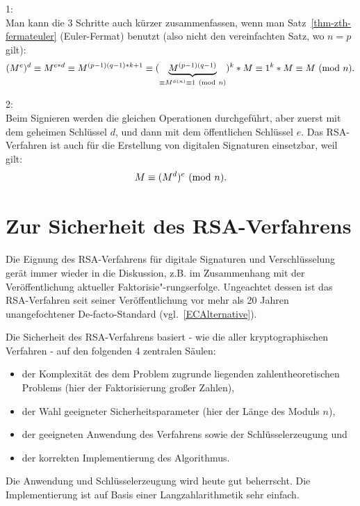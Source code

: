 \begin{refsegment}
\begin{remark}{ 1:}\\
Man kann die 3 Schritte auch kürzer zusammenfassen, wenn man
Satz~\ref{thm-zth-fermateuler} (Euler-Fermat) benutzt (also nicht den
vereinfachten Satz, wo $n = p$ gilt):
$$
(M^e)^d \equiv M^{e*d} \equiv M^{(p-1)(q-1)*k + 1} \equiv
        (\underbrace{M^{(p-1)(q-1)}}_{\equiv M^{\phi(n)} \equiv 1 {\rm ~(mod~}n)})^k * M
    \equiv 1^k * M \equiv M {\rm ~(mod~}n).
$$
\end{remark}


\begin{remark}{ 2:}\\
Beim Signieren werden die gleichen Operationen durchgeführt, aber zuerst mit
dem geheimen Schlüssel $d$, und dann mit dem öffentlichen Schlüssel $e$. Das
RSA-Verfahren ist auch für die Erstellung von digitalen
Signaturen
einsetzbar, weil gilt:
$$
M \equiv (M^d)^e{\rm ~(mod~}n).
$$
\vspace{0ex}
\end{remark}



\newpage
\hypertarget{SecurityRSA}{}
\section[Zur Sicherheit des RSA-Verfahrens]
{Zur Sicherheit des RSA-Verfahrens\footnotemark}
    \label{SecurityRSA}

Die Eignung des RSA-Verfahrens für digitale Signaturen und Verschlüsselung gerät immer wieder in die Diskussion,
z.B. im Zusammenhang mit der Veröffentlichung aktueller Faktorisie"-rungserfolge. Ungeachtet dessen ist das RSA-Verfahren
seit seiner Veröffentlichung vor mehr als 20 Jahren unangefochtener
De-facto-Standard (vgl.~\ref{ECAlternative}).

Die Sicherheit des RSA-Verfahrens basiert - wie die aller kryptographischen Verfahren - auf den folgenden 4 zentralen
Säulen:
\begin{itemize}
\item der Komplexität des dem Problem zugrunde liegenden zahlentheoretischen Problems (hier der Faktorisierung
       großer Zahlen),
\item der Wahl geeigneter Sicherheitsparameter (hier der Länge des Moduls $n$),
\item der geeigneten Anwendung des Verfahrens sowie der Schlüsselerzeugung und
\item der korrekten Implementierung des Algorithmus.
\end{itemize}
Die Anwendung und Schlüsselerzeugung wird heute gut beherrscht.
Die Implementierung ist auf Basis einer Langzahlarithmetik sehr einfach.


\end{refsegment}
